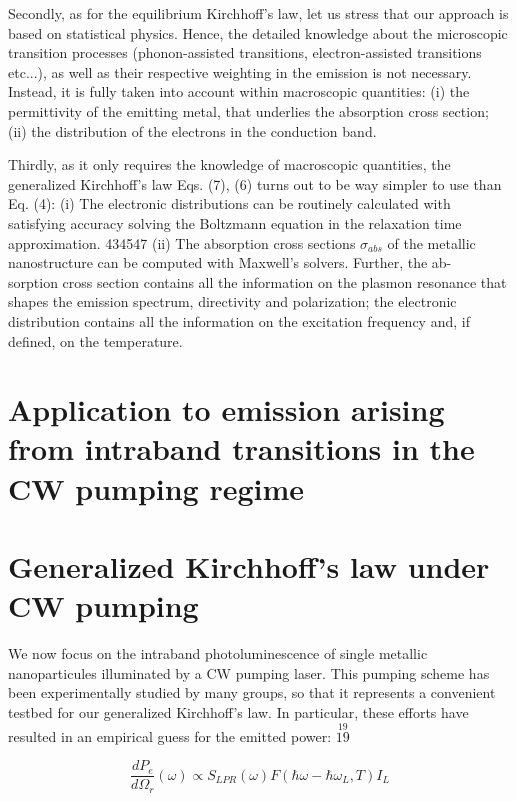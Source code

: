 \documentclass[10pt]{article}
\begin{document}
Secondly, as for the equilibrium Kirchhoff's law, let us stress that our approach is based on statistical physics. Hence, the detailed knowledge about the microscopic transition processes (phonon-assisted transitions, electron-assisted transitions etc...), as well as their respective weighting in the emission is not necessary. Instead, it is fully taken into account within macroscopic quantities: (i) the permittivity of the emitting metal, that underlies the absorption cross section; (ii) the distribution of the electrons in the conduction band.

Thirdly, as it only requires the knowledge of macroscopic quantities, the generalized Kirchhoff's law Eqs. (7), (6) turns out to be way simpler to use than Eq. (4): (i) The electronic distributions can be routinely calculated with satisfying accuracy solving the Boltzmann equation in the relaxation time approximation. 434547 (ii) The absorption cross sections $\sigma_{a b s}$ of the metallic nanostructure can be computed with Maxwell's solvers. Further, the ab-\\
sorption cross section contains all the information on the plasmon resonance that shapes the emission spectrum, directivity and polarization; the electronic distribution contains all the information on the excitation frequency and, if defined, on the temperature.

\section*{Application to emission arising from intraband transitions in the CW pumping regime}
\section*{Generalized Kirchhoff's law under CW pumping}
We now focus on the intraband photoluminescence of single metallic nanoparticules illuminated by a CW pumping laser. This pumping scheme has been experimentally studied by many groups, so that it represents a convenient testbed for our generalized Kirchhoff's law. In particular, these efforts have resulted in an empirical guess for the emitted power: $\stackrel{19}{19}$


\begin{equation*}
\frac{d P_{e}}{d \Omega_{r}}(\omega) \propto S_{L P R}(\omega) F\left(\hbar \omega-\hbar \omega_{L}, T\right) I_{L} \tag{8}
\end{equation*}
\end{document}
